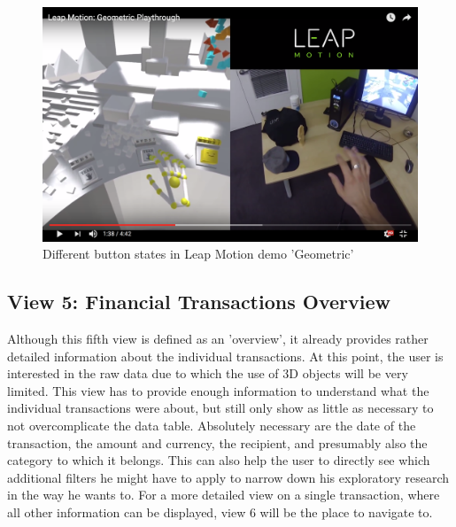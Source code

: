 \begin{figure}[h]
	\begin{center}
		\includegraphics[width=14cm]{03_Figures/07_Suggestion/LeapMotion2016_Geometric.png}
		\caption[Different button states in Leap Motion demo 'Geometric']{Different button states in Leap Motion demo 'Geometric' \citep{LeapMotion2016}}
		\label{fig:leapmotiongeometric}
	\end{center}
\end{figure}



\subsection{View 5: Financial Transactions Overview}

Although this fifth view is defined as an 'overview', it already provides rather detailed information about the individual transactions. At this point, the user is interested in the raw data due to which the use of 3D objects will be very limited. This view has to provide enough information to understand what the individual transactions were about, but still only show as little as necessary to not overcomplicate the data table. Absolutely necessary are the date of the transaction, the amount and currency, the recipient, and presumably also the category to which it belongs. This can also help the user to directly see which additional filters he might have to apply to narrow down his exploratory research in the way he wants to. For a more detailed view on a single transaction, where all other information can be displayed, view 6 will be the place to navigate to.


